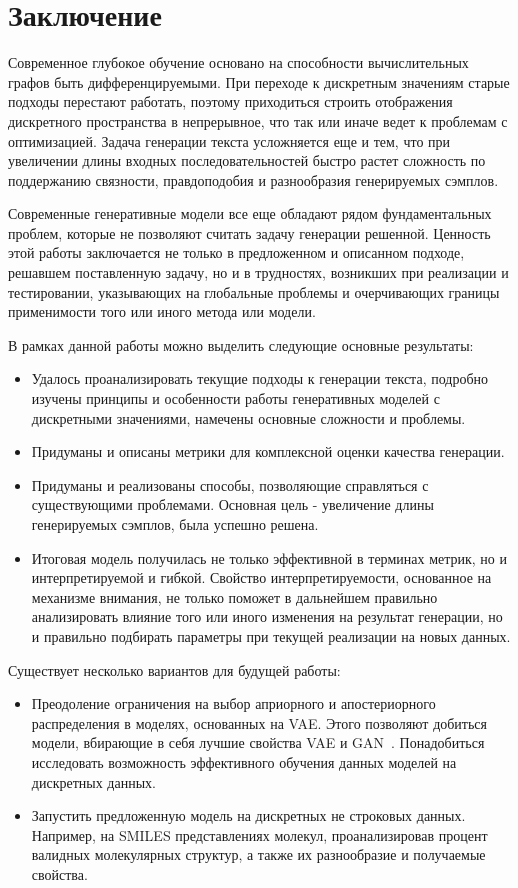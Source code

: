 \documentclass{spbau-diploma}
\begin{document}
\section*{Заключение}
Современное глубокое обучение основано на способности вычислительных графов
быть дифференцируемыми. При переходе к дискретным значениям старые подходы
перестают работать, поэтому приходиться строить отображения дискретного 
пространства в непрерывное, что так или иначе ведет к проблемам с оптимизацией.
Задача генерации текста усложняется еще и тем, что 
при увеличении длины входных последовательностей быстро растет сложность по 
поддержанию связности, правдоподобия и разнообразия генерируемых сэмплов.

Современные генеративные модели все еще обладают рядом фундаментальных проблем,
которые не позволяют считать задачу генерации решенной. Ценность этой работы 
заключается не только в предложенном и описанном подходе, решавшем 
поставленную задачу, но и в трудностях, возникших при реализации и  
тестировании, указывающих на глобальные проблемы и очерчивающих границы 
применимости того или иного метода или модели.

В рамках данной работы можно выделить следующие основные результаты:
\begin{itemize}
    \item Удалось проанализировать текущие подходы к генерации текста, подробно изучены принципы и особенности работы генеративных моделей с дискретными значениями, намечены основные сложности и проблемы.
    \item Придуманы и описаны метрики для комплексной оценки качества генерации.
    \item Придуманы и реализованы способы, позволяющие справляться с существующими проблемами. Основная цель - увеличение длины генерируемых сэмплов, была успешно решена.
    \item Итоговая модель получилась не только эффективной в терминах метрик, но и интерпретируемой и гибкой. Свойство интерпретируемости, основанное на механизме внимания, не только поможет в дальнейшем правильно анализировать влияние того или иного изменения на результат генерации, но и правильно подбирать параметры при текущей реализации на новых данных.
\end{itemize}

Существует несколько вариантов для будущей работы:
\begin{itemize}
    \item Преодоление ограничения на выбор априорного и апостериорного распределения в моделях, основанных на VAE. Этого позволяют добиться модели, вбирающие в себя лучшие свойства VAE и GAN~\cite{vetrovgan, aae, alphagan}. Понадобиться исследовать возможность эффективного обучения данных моделей на дискретных данных.
    \item Запустить предложенную модель на дискретных не строковых данных. Например, на SMILES представлениях молекул, проанализировав процент валидных молекулярных структур, а также их разнообразие и получаемые свойства.
\end{itemize}



\end{document}
